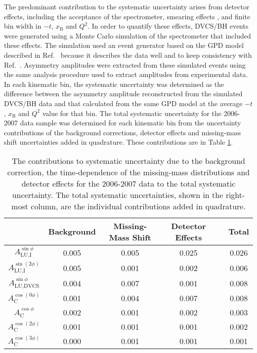 The predominant contribution to the systematic uncertainty arises from detector
effects, including the acceptance of the spectrometer, smearing effects , and
finite bin width in $-t$, $x_{\textrm{B}}$ and $Q^{2}$. In order to quantify
these effects, DVCS/BH events were generated using a Monte Carlo simulation of
the spectrometer that included these effects. The simulation used an event
generator based on the GPD model described in Ref.~\cite{Guz06} because it describes the data well and to keep consistency with Ref.~\cite{Air09}. Asymmetry amplitudes were extracted from these simulated events using the same analysis
procedure used to extract amplitudes from experimental data.  In each kinematic
bin, the systematic uncertainty was determined as the difference between the
asymmetry amplitude reconstructed from the simulated DVCS/BH data and that
calculated from the same GPD model at the average $-t$, $x_{\textrm{B}}$ and
$Q^{2}$ value for that bin.
The total systematic uncertainty for the 2006-2007 data sample was
determined for each kinematic bin from the uncertainty contributions of the
background corrections, detector effects and missing-mass shift
uncertainties added in quadrature. These contributions are  in Table
\ref{table_systematic_contributions_0607}.

\begin{table}[H]
 \begin{center}
\resizebox{16cm}{!} {
 \begin{tabular}{|c|c|c|c|c|c|}
  \hline
 & Background & Missing-Mass Shift & Detector Effects & & Total \\
  \hline
  \hline
  $A_{\textrm{LU,I}}^{\sin\phi}$ & 0.005 & 0.005 & 0.025 & & 0.026 \\
  \hline
  $A_{\textrm{LU,I}}^{\sin(2\phi)}$ & 0.005 & 0.001 & 0.002 & & 0.006 \\
  \hline
  \hline
  $A_{\textrm{LU,DVCS}}^{\sin\phi}$  & 0.004 & 0.007 & 0.001 & & 0.008 \\
  \hline
  \hline
  $A_{\textrm{C}}^{\cos(0\phi)}$ & 0.001 & 0.004 & 0.007 & & 0.008 \\
  \hline
  $A_{\textrm{C}}^{\cos\phi}$ & 0.002 & 0.001 & 0.002 & & 0.003 \\
  \hline
  $A_{\textrm{C}}^{\cos(2\phi)}$ & 0.001 & 0.001 & 0.001 & & 0.002 \\
  \hline
  $A_{\textrm{C}}^{\cos(3\phi)}$ & 0.000 & 0.001 & 0.001 & & 0.001 \\
  \hline
 \end{tabular}
}
  \caption{The contributions to systematic uncertainty due to the
background correction, the time-dependence of the missing-mass
distributions and detector effects for the 2006-2007 data to the total
systematic uncertainty. The total systematic uncertainties, shown in the
right-most column, are the individual contributions added in quadrature.}
  \label{table_systematic_contributions_0607}
\end{center}
\end{table}
